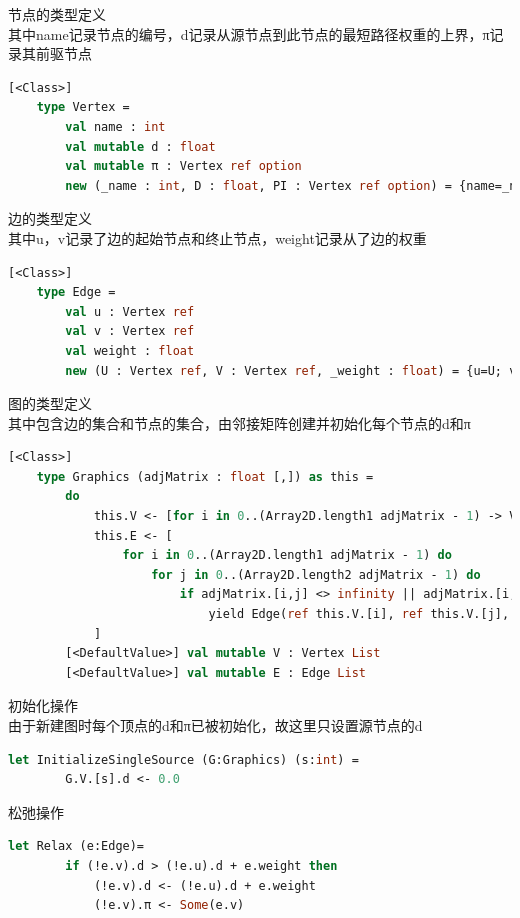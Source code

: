 \documentclass[a4paper]{article}
\begin{document}
节点的类型定义\\
其中name记录节点的编号，d记录从源节点到此节点的最短路径权重的上界，π记录其前驱节点
\begin{lstlisting}[language=ML]
    [<Class>]
    type Vertex = 
        val name : int
        val mutable d : float
        val mutable π : Vertex ref option
        new (_name : int, D : float, PI : Vertex ref option) = {name=_name; d=D; π=PI}
\end{lstlisting}

边的类型定义\\
其中u，v记录了边的起始节点和终止节点，weight记录从了边的权重
\begin{lstlisting}[language=ML]
    [<Class>]
    type Edge = 
        val u : Vertex ref
        val v : Vertex ref
        val weight : float
        new (U : Vertex ref, V : Vertex ref, _weight : float) = {u=U; v=V; weight=_weight}
\end{lstlisting}

图的类型定义\\
其中包含边的集合和节点的集合，由邻接矩阵创建并初始化每个节点的d和π
\begin{lstlisting}[language=ML]
    [<Class>]
    type Graphics (adjMatrix : float [,]) as this =
        do
            this.V <- [for i in 0..(Array2D.length1 adjMatrix - 1) -> Vertex(i,infinity,None)]
            this.E <- [
                for i in 0..(Array2D.length1 adjMatrix - 1) do
                    for j in 0..(Array2D.length2 adjMatrix - 1) do
                        if adjMatrix.[i,j] <> infinity || adjMatrix.[i,j] <> 0.0 then
                            yield Edge(ref this.V.[i], ref this.V.[j], adjMatrix.[i,j])
            ]
        [<DefaultValue>] val mutable V : Vertex List
        [<DefaultValue>] val mutable E : Edge List
\end{lstlisting}

初始化操作\\
由于新建图时每个顶点的d和π已被初始化，故这里只设置源节点的d
\begin{lstlisting}[language=ML]
    let InitializeSingleSource (G:Graphics) (s:int) =
        G.V.[s].d <- 0.0
\end{lstlisting}

松弛操作
\begin{lstlisting}[language=ML]
    let Relax (e:Edge)= 
        if (!e.v).d > (!e.u).d + e.weight then
            (!e.v).d <- (!e.u).d + e.weight
            (!e.v).π <- Some(e.v)
\end{lstlisting}
\end{document}
